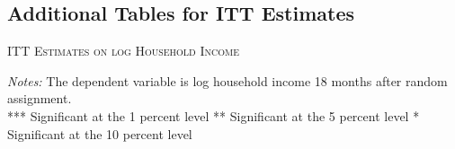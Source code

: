 \begin{appendices}
\newpage

\subsection{Additional Tables for ITT Estimates} \label{appendix_itt_estimates}

\begin{table}[H]
\centering
\caption{\textsc{ITT Estimates on log Household Income}}
\addtolength{\tabcolsep}{24pt}

\addtolength{\tabcolsep}{-24pt}

\medskip


\label{tab:table_complete_nocontr}
\bigskip
\raggedright
\footnotesize
\textit{Notes:} The dependent variable is log household income 18 months after random assignment. \\
*** Significant at the 1 percent level ** Significant at the 5 percent level * Significant at the 10 percent level
\end{table}

\end{appendices}

